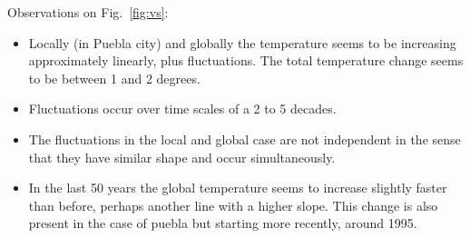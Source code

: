 \documentclass{article}
\begin{document}
Observations on  Fig.~\ref{fig:vs}:
\begin{itemize}
\item Locally (in Puebla city) and globally the temperature seems to be increasing approximately linearly, plus
fluctuations. The total temperature change seems to be between 1 and 2 degrees. 
\item Fluctuations occur over time scales of a 2 to 5 decades. 
\item The fluctuations in the local and global case are not independent in the sense that they  
have similar shape and occur simultaneously. 
\item In the last 50 years the global temperature seems to increase slightly faster than before, perhaps 
another line with a higher slope. This change is also present in the case of puebla 
but starting more recently, around 1995. 
\end{itemize}



\end{document}
